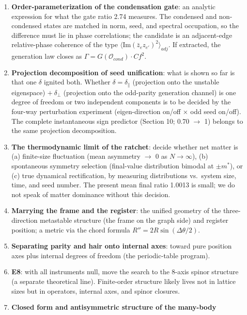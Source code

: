 \documentclass[
  a4paper,
]{article}
\providecommand{\tightlist}{%
  \setlength{\itemsep}{0pt}\setlength{\parskip}{0pt}}
\begin{document}
\begin{enumerate}
\def\labelenumi{\arabic{enumi}.}
\tightlist
\item
  \textbf{Order-parameterization of the condensation gate}: an analytic
  expression for what the gate ratio 2.74 measures. The condensed and
  non-condensed states are matched in norm, seed, and spectral
  occupation, so the difference must lie in phase correlations; the
  candidate is an adjacent-edge relative-phase coherence of the type
  \(\langle \mathrm{Im}(\bar z_e z_{e'})^2\rangle_{adj}\). If extracted,
  the generation law closes as
  \(\Gamma = G(\mathcal{O}_{cond})\cdot Cf^2\).
\item
  \textbf{Projection decomposition of seed unification}: what is shown
  so far is that one \(\delta\) ignited both. Whether
  \(\delta = \delta_\parallel\) (projection onto the unstable
  eigenspace) \(+\ \delta_\perp\) (projection onto the odd-parity
  generation channel) is one degree of freedom or two independent
  components is to be decided by the four-way perturbation experiment
  (eigen-direction on/off \(\times\) odd seed on/off). The complete
  instantaneous sign predictor (Section 10; 0.70 \(\to\) 1) belongs to
  the same projection decomposition.
\item
  \textbf{The thermodynamic limit of the ratchet}: decide whether net
  matter is (a) finite-size fluctuation (mean asymmetry \(\to\) 0 as
  \(N\to\infty\)), (b) spontaneous symmetry selection (final-value
  distribution bimodal at \(\pm m^*\)), or (c) true dynamical
  rectification, by measuring distributions vs.~system size, time, and
  seed number. The present mean final ratio 1.0013 is small; we do not
  speak of matter dominance without this decision.
\item
  \textbf{Marrying the frame and the register}: the unified geometry of
  the three-direction metastable structure (the frame on the graph side)
  and register position; a metric via the chord formula
  \(R''=2R\sin(\Delta\theta/2)\).
\item
  \textbf{Separating parity and hair onto internal axes}: toward pure
  position axes plus internal degrees of freedom (the periodic-table
  program).
\item
  \textbf{E8}: with all instruments null, move the search to the 8-axis
  spinor structure (a separate theoretical line). Finite-order structure
  likely lives not in lattice sizes but in operators, internal axes, and
  spinor closures.
\item
  \textbf{Closed form and antisymmetric structure of the many-body
}
\end{enumerate}
\end{document}
